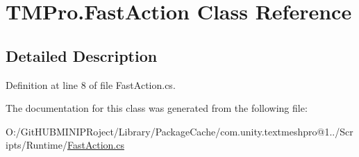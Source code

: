 \hypertarget{class_t_m_pro_1_1_fast_action}{}\section{T\+M\+Pro.\+Fast\+Action Class Reference}
\label{class_t_m_pro_1_1_fast_action}


\subsection{Detailed Description}


Definition at line 8 of file Fast\+Action.\+cs.



The documentation for this class was generated from the following file\+:\begin{DoxyCompactItemize}
\item 
O\+:/\+Git\+H\+U\+B\+M\+I\+N\+I\+P\+Roject/\+Library/\+Package\+Cache/com.\+unity.\+textmeshpro@1../\+Scripts/\+Runtime/\mbox{\hyperlink{_fast_action_8cs}{Fast\+Action.\+cs}}\end{DoxyCompactItemize}
